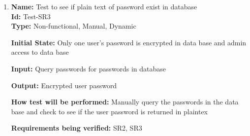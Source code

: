 \documentclass[12pt, titlepage]{article}
\begin{document}
\begin{enumerate}
    					
    					
    					
    					
    
    \item{\textbf{Name:} Test to see if plain text of password exist in database\\} \label{Test-SR3}
    \textbf{Id:} Test-SR3\\
    
    \textbf{Type:} Non-functional, Manual, Dynamic
    					
    \textbf{Initial State:} Only one user's password is encrypted in data base and admin access to data base
    					
    \textbf{Input:} Query passwords for passwords in database
    					
    \textbf{Output:} Encrypted user password
    					
    \textbf{How test will be performed:} Manually query the passwords in the data base and check to see if the user password is returned in plaintex
    
    \textbf{Requirements being verified:} SR2, SR3
\end{enumerate}
\end{document}
